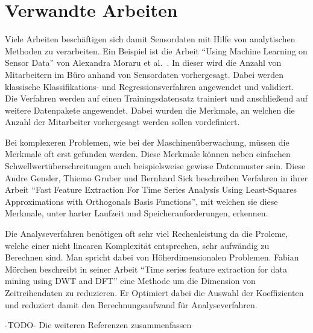 \section{Verwandte Arbeiten}
Viele Arbeiten  beschäftigen sich damit Sensordaten mit Hilfe von analytischen Methoden zu verarbeiten. 
Ein Beispiel ist die Arbeit \enquote{Using Machine Learning on Sensor Data} von Alexandra Moraru et al.~\cite{moraru2010using}. 
In dieser wird die Anzahl von Mitarbeitern im Büro anhand von Sensordaten vorhergesagt.
Dabei werden klassische Klassifikations- und Regressionsverfahren angewendet und validiert. 
Die Verfahren werden auf einen Trainingsdatensatz trainiert und anschließend auf weitere Datenpakete angewendet. 
Dabei wurden die Merkmale, an welchen die Anzahl der Mitarbeiter vorhergesagt werden sollen vordefiniert. 

Bei komplexeren Problemen, wie bei der Maschinenüberwachung, müssen die Merkmale oft erst gefunden werden. 
Diese Merkmale können neben einfachen Schwellwertüberschreitungen auch beispielsweise gewisse Datenmuster sein. 
Diese  Andre Gensler, Thiemo Gruber und Bernhard Sick beschreiben Verfahren in ihrer Arbeit \enquote{Fast Feature Extraction For Time Series Analysis Using Least-Squares Approximations with Orthogonals Basis Functions}, mit welchen sie diese Merkmale, unter harter Laufzeit und Speicheranforderungen, erkennen. 

Die Analyseverfahren benötigen oft sehr viel Rechenleistung da die Proleme, welche einer nicht linearen Komplexität entsprechen, sehr aufwändig zu Berechnen sind. 
Man spricht dabei von Höherdimensionalen Problemen. 
Fabian Mörchen beschreibt in seiner Arbeit \enquote{Time series feature extraction for data mining using DWT and DFT} eine Methode um die Dimension von Zeitreihendaten zu reduzieren. 
Er Optimiert dabei die Auswahl der Koeffizienten und reduziert damit den Berechnungsaufwand für Analyseverfahren.

\begin{center}
  -TODO- Die weiteren Referenzen zusammenfassen
\end{center}
